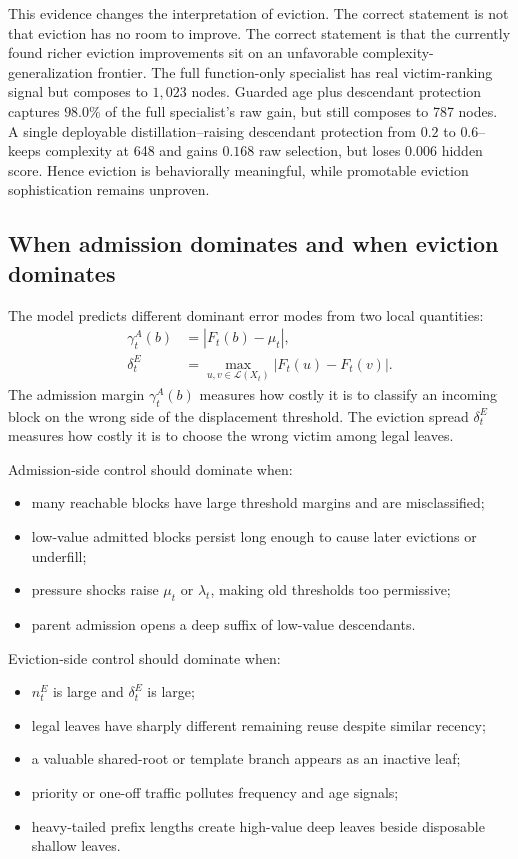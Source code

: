 \documentclass[11pt]{article}
\begin{document}
This evidence changes the interpretation of eviction.  The correct statement is not
that eviction has no room to improve.  The correct statement is that the currently
found richer eviction improvements sit on an unfavorable complexity-generalization
frontier.  The full function-only specialist has real victim-ranking signal but
composes to \(1{,}023\) nodes.  Guarded age plus descendant protection captures
\(98.0\%\) of the full specialist's raw gain, but still composes to 787 nodes.  A
single deployable distillation--raising descendant protection from \(0.2\) to
\(0.6\)--keeps complexity at 648 and gains \(0.168\) raw selection, but loses
\(0.006\) hidden score.  Hence eviction is behaviorally meaningful, while promotable
eviction sophistication remains unproven.

\subsection{When admission dominates and when eviction dominates}

The model predicts different dominant error modes from two local quantities:
\begin{align}
  \gamma^A_t(b)&=|F_t(b)-\mu_t|,
  \label{eq:admission-margin-regime}\\
  \delta^E_t&=\max_{u,v\in\mathcal L(X_t)}|F_t(u)-F_t(v)|.
  \label{eq:eviction-spread-regime}
\end{align}
The admission margin \(\gamma^A_t(b)\) measures how costly it is to classify an
incoming block on the wrong side of the displacement threshold.  The eviction spread
\(\delta^E_t\) measures how costly it is to choose the wrong victim among legal leaves.

Admission-side control should dominate when:
\begin{itemize}
  \item many reachable blocks have large threshold margins and are misclassified;
  \item low-value admitted blocks persist long enough to cause later evictions or
  underfill;
  \item pressure shocks raise \(\mu_t\) or \(\lambda_t\), making old thresholds too
  permissive;
  \item parent admission opens a deep suffix of low-value descendants.
\end{itemize}

Eviction-side control should dominate when:
\begin{itemize}
  \item \(n^E_t\) is large and \(\delta^E_t\) is large;
  \item legal leaves have sharply different remaining reuse despite similar recency;
  \item a valuable shared-root or template branch appears as an inactive leaf;
  \item priority or one-off traffic pollutes frequency and age signals;
  \item heavy-tailed prefix lengths create high-value deep leaves beside disposable
  shallow leaves.
\end{itemize}
\end{document}
